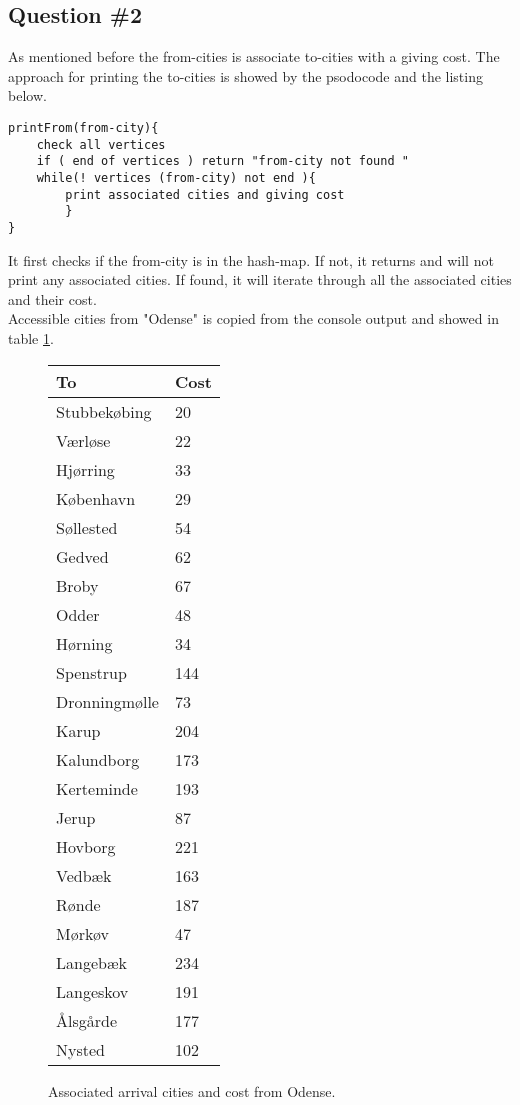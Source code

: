 \subsection{Question \#2}
As mentioned before the from-cities is associate to-cities with a giving cost. The approach for printing the to-cities is showed by the psodocode and the listing below. 
\bigskip
\begin{lstlisting}
printFrom(from-city){
	check all vertices 
	if ( end of vertices ) return "from-city not found "
	while(! vertices (from-city) not end ){
	    print associated cities and giving cost
        }
}
\end{lstlisting}
\bigskip
It first checks if the from-city is in the hash-map. If not, it returns and will not print any associated cities. If found, it will iterate through all the associated cities and their cost.\\
Accessible cities from "Odense" is copied from the console output and showed in table \ref{tb:fromodense}. 
\begin{figure}[th!]
\centering
\begin{tabular}{l|l}
To &Cost\\\hline
Stubbekøbing & 20\\
Værløse & 22\\
Hjørring & 33\\
København & 29\\
Søllested & 54\\
Gedved & 62\\
Broby & 67\\
Odder & 48\\
Hørning & 34\\
Spenstrup & 144\\
Dronningmølle & 73\\
Karup & 204\\
Kalundborg & 173\\
Kerteminde & 193\\
Jerup & 87\\
Hovborg & 221\\
Vedbæk & 163\\
Rønde & 187\\
Mørkøv & 47\\
Langebæk & 234\\
Langeskov & 191\\
Ålsgårde & 177\\
Nysted & 102\\
\end{tabular}
\captionsetup{type=table}
\caption[tekst i indholdsfortegnelsen]{Associated arrival cities and cost from Odense.}
\label{tb:fromodense}
\end{figure}

